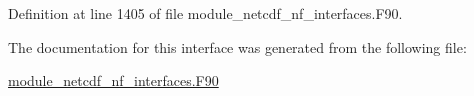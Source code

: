 Definition at line 1405 of file module\+\_\+netcdf\+\_\+nf\+\_\+interfaces.\+F90.



The documentation for this interface was generated from the following file\+:\begin{DoxyCompactItemize}
\item 
\hyperlink{module__netcdf__nf__interfaces_8F90}{module\+\_\+netcdf\+\_\+nf\+\_\+interfaces.\+F90}\end{DoxyCompactItemize}
